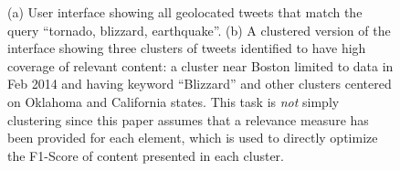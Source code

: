 
\begin{figure}[t]
\begin{centering}
\par\end{centering}
\caption{(a) User interface showing all geolocated tweets that match the query ``tornado, blizzard, earthquake''. (b) A clustered version of the interface showing three clusters of tweets identified to have high coverage of relevant content: a cluster near Boston limited to data in Feb 2014 and having keyword ``Blizzard'' and other clusters centered on Oklahoma and California states.  This task is \emph{not} simply clustering since this paper assumes that a relevance measure has been provided for each element, which is used to directly optimize the F1-Score of content presented in each cluster.}
\label{Fig:UseCase}
\end{figure}

